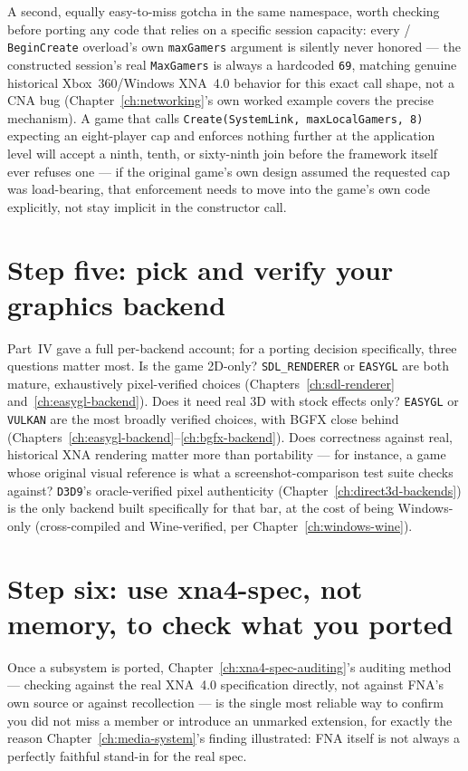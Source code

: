 A second, equally easy-to-miss gotcha in the same namespace, worth checking before porting any
code that relies on a specific session capacity: every /%
\texttt{BeginCreate} overload's own \texttt{maxGamers} argument is silently never honored ---
the constructed session's real \texttt{MaxGamers} is always a hardcoded \texttt{69}, matching
genuine historical Xbox~360/Windows XNA~4.0 behavior for this exact call shape, not a CNA bug
(Chapter~\ref{ch:networking}'s own worked example covers the precise mechanism). A game that
calls \texttt{Create(SystemLink, maxLocalGamers, 8)} expecting an eight-player cap and enforces
nothing further at the application level will accept a ninth, tenth, or sixty-ninth join before
the framework itself ever refuses one --- if the original game's own design assumed the
requested cap was load-bearing, that enforcement needs to move into the game's own code
explicitly, not stay implicit in the constructor call.

\section{Step five: pick and verify your graphics backend}

Part~IV gave a full per-backend account; for a porting decision specifically,
three questions matter most. Is the game 2D-only? \texttt{SDL\_RENDERER} or \texttt{EASYGL}
are both mature, exhaustively pixel-verified choices (Chapters~\ref{ch:sdl-renderer}
and~\ref{ch:easygl-backend}). Does it need real 3D with stock effects only?
\texttt{EASYGL} or \texttt{VULKAN} are the most broadly verified choices, with BGFX close
behind (Chapters~\ref{ch:easygl-backend}--\ref{ch:bgfx-backend}). Does correctness against
real, historical XNA rendering matter more than portability --- for instance, a game whose
original visual reference is what a screenshot-comparison test suite checks against?
\texttt{D3D9}'s oracle-verified pixel authenticity (Chapter~\ref{ch:direct3d-backends}) is
the only backend built specifically for that bar, at the cost of being Windows-only
(cross-compiled and Wine-verified, per Chapter~\ref{ch:windows-wine}).

\section{Step six: use xna4-spec, not memory, to check what you ported}

Once a subsystem is ported, Chapter~\ref{ch:xna4-spec-auditing}'s auditing method --- checking
against the real XNA~4.0 specification directly, not against FNA's own source or against
recollection --- is the single most reliable way to confirm you did not miss a member or
introduce an unmarked extension, for exactly the reason Chapter~\ref{ch:media-system}'s
 finding illustrated: FNA itself is not always a perfectly faithful stand-in
for the real spec.

